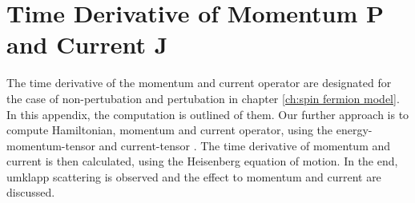%
%
%
\chapter{Time Derivative of Momentum P and Current J}
\label{appch:time derivative P and J}
%
%
%
The time derivative of the momentum and current operator are designated for the case of non-pertubation and pertubation in chapter \ref{ch:spin fermion model}.
In this appendix, the computation is outlined of them.
Our further approach is to compute Hamiltonian, momentum and current operator, using the energy-momentum-tensor and current-tensor \cite{Iliev}.
The time derivative of momentum and current is then calculated, using the Heisenberg equation of motion.
In the end, umklapp scattering is observed and the effect to momentum and current are discussed.

